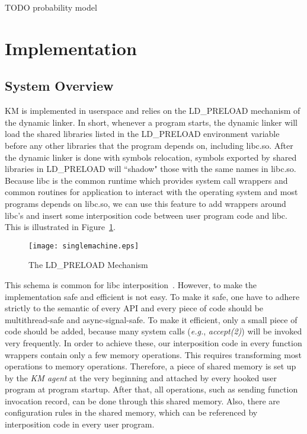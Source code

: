 \documentclass[letterpaper,twocolumn,10pt]{article}
\begin{document}
TODO probability model

\section{Implementation}

\subsection{System Overview} KM is implemented in userspace and relies on the
LD\_PRELOAD mechanism of the dynamic linker. In short, whenever a program
starts, the dynamic linker will load the shared libraries listed in the
LD\_PRELOAD environment variable before any other libraries that the program
depends on, including libc.so. After the dynamic linker is done with symbols
relocation, symbols exported by shared libraries in LD\_PRELOAD will ``shadow"
those with the same names in libc.so. Because libc is the common runtime which
provides system call wrappers and common routines for application to interact
with the operating system and most programs depends on libc.so, we can use
this feature to add wrappers around libc's and insert some interposition code
between user program code and libc. This is illustrated in
Figure~\ref{fig:ldpreload}.

\begin{figure}[H]
    \centering
    \texttt{[image: singlemachine.eps]}
    \caption{The LD\_PRELOAD Mechanism}
    \label{fig:ldpreload}
\end{figure}

This schema is common for libc interposition~\cite{LDPRELOADLee:2011}. However, to
make the implementation safe and efficient is not easy. To make it safe, one
have to adhere strictly to the semantic of every API and every piece of code
should be multithread-safe and async-signal-safe. To make it efficient, only
a small piece of code should be added, because many system calls
(\textit{e.g.}, \textit{accept(2)}) will be invoked very frequently. In order
to achieve these, our interposition code in every function wrappers contain
only a few memory operations. This requires transforming most operations to
memory operations. Therefore, a piece of shared memory is set up by the
\textit{KM agent} at the very beginning and attached by every hooked user
program at program startup. After that, all operations, such as sending
function invocation record, can be done through this shared memory. Also,
there are configuration rules in the shared memory, which can be referenced
by interposition code in every user program.\\ 
\end{document}
